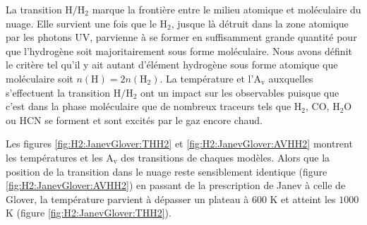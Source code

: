 La transition $\mathrm{H}/\mathrm{H}_2$ marque la frontière entre le milieu atomique et moléculaire du nuage. Elle survient une fois que le $\mathrm{H}_2$, jusque là détruit dans la zone atomique par les photons UV, parvienne à se former en suffisamment grande quantité pour que l'hydrogène soit majoritairement sous forme moléculaire. Nous avons définit le critère tel qu'il y ait autant d'élément hydrogène sous forme atomique que moléculaire soit $n(\mathrm{H}) = 2 n(\mathrm{H}_2)$. La température et l'$\mathrm{A}_\mathrm{v}$ auxquelles s'effectuent la transition $\mathrm{H}/\mathrm{H}_2$ ont un impact sur les observables puisque que c'est dans la phase moléculaire que de nombreux traceurs tels que $\mathrm{H}_2$,  $\mathrm{CO}$, $\mathrm{H}_2\mathrm{O}$ ou $\mathrm{HCN}$ se forment et sont excités par le gaz encore chaud. \newline

Les figures \ref{fig:H2:JanevGlover:THH2} et \ref{fig:H2:JanevGlover:AVHH2} montrent les températures et les $\mathrm{A}_\mathrm{v}$ des transitions de chaques modèles. Alors que la position de la transition dans le nuage reste sensiblement identique (figure \ref{fig:H2:JanevGlover:AVHH2}) en passant de la prescription de Janev à celle de Glover, la température parvient à dépasser un plateau à $600$ K et atteint les $1000$ K (figure \ref{fig:H2:JanevGlover:THH2}). 


